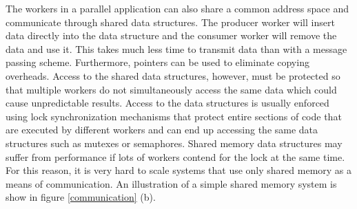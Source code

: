 \documentclass[11pt]{book}
\begin{document}
The workers in a parallel application can also share a common address space and communicate
through shared data structures. The producer worker will insert data directly into the data
structure and the consumer worker will remove the data and use it. This takes much less time
to transmit data than with a message passing scheme. Furthermore, pointers can be used to
eliminate copying overheads. Access to the shared data structures, however, must be protected
so that multiple workers do not simultaneously access the same data which could cause unpredictable
results. Access to the data structures is usually enforced using lock synchronization mechanisms
that protect entire sections of code that are executed by different workers and can end up accessing
the same data structures such as mutexes or semaphores. Shared memory data structures may suffer
from performance if lots of workers contend for the lock at the same time. For this reason, it
is very hard to scale systems that use only shared memory as a means of communication.
An illustration of a simple shared memory system is show in figure \ref{communication} (b).
\end{document}
